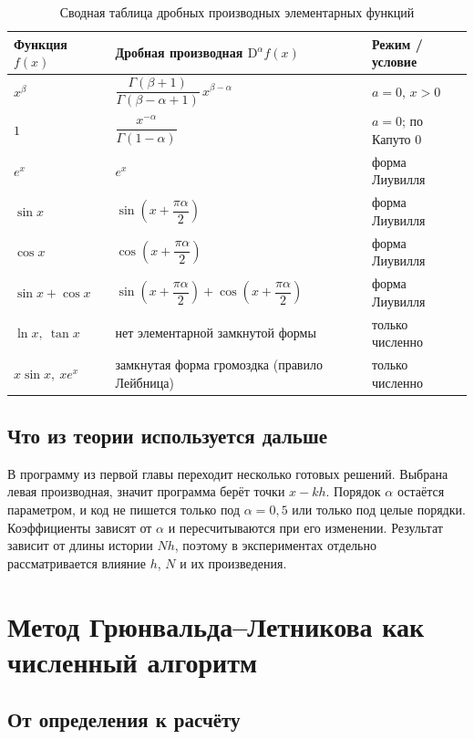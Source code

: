 \documentclass[14pt,a4paper]{extarticle}
\newcommand{\D}{\mathrm{D}}
\begin{document}
\begin{table}[htbp]
\centering
\caption{Сводная таблица дробных производных элементарных функций}
\label{tab:reftable}
\begin{tabular}{|L{3.2cm}|L{6.4cm}|L{2.9cm}|}
\hline
Функция $f(x)$ & Дробная производная $\D^{\alpha}f(x)$ & Режим / условие \\
\hline
$x^{\beta}$ & $\dfrac{\Gamma(\beta+1)}{\Gamma(\beta-\alpha+1)}\,x^{\beta-\alpha}$ & $a=0$, $x>0$ \\
\hline
$1$ & $\dfrac{x^{-\alpha}}{\Gamma(1-\alpha)}$ & $a=0$; по Капуто $0$ \\
\hline
$e^{x}$ & $e^{x}$ & форма Лиувилля \\
\hline
$\sin x$ & $\sin\!\left(x+\dfrac{\pi\alpha}{2}\right)$ & форма Лиувилля \\
\hline
$\cos x$ & $\cos\!\left(x+\dfrac{\pi\alpha}{2}\right)$ & форма Лиувилля \\
\hline
$\sin x+\cos x$ & $\sin\!\left(x+\dfrac{\pi\alpha}{2}\right)+\cos\!\left(x+\dfrac{\pi\alpha}{2}\right)$ & форма Лиувилля \\
\hline
$\ln x,\ \tan x$ & нет элементарной замкнутой формы & только численно \\
\hline
$x\sin x,\ x e^{x}$ & замкнутая форма громоздка (правило Лейбница) & только численно \\
\hline
\end{tabular}
\end{table}

\subsection{Что из теории используется дальше}

В программу из первой главы переходит несколько готовых решений. Выбрана левая производная, значит программа берёт точки $x-kh$. Порядок $\alpha$ остаётся параметром, и код не пишется только под $\alpha=0{,}5$ или только под целые порядки. Коэффициенты зависят от $\alpha$ и пересчитываются при его изменении. Результат зависит от длины истории $Nh$, поэтому в экспериментах отдельно рассматривается влияние $h$, $N$ и их произведения.

\section{Метод Грюнвальда--Летникова как численный алгоритм}

\subsection{От определения к расчёту}
\end{document}
